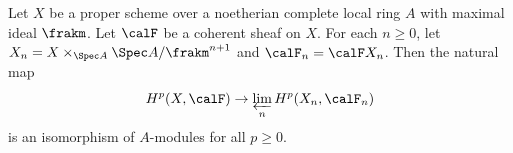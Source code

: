 \begin{theorem}\label{thm:theorem_on_the_formal_functions}
        Let \(X\) be a proper scheme over a noetherian complete local ring \(A\) with maximal ideal \(\frakm\).
        Let \(\calF\) be a coherent sheaf on \(X\).
        For each \(n \geq 0\), let \(X_n = X \times_{\Spec A} \Spec A/\frakm^{n+1}\) and \(\calF_n = \calF  X_n\).
        Then the natural map
        \[
            H^p(X, \calF) \to \varprojlim_n H^p(X_n, \calF_n)
        \]
        is an isomorphism of \(A\)-modules for all \(p \geq 0\).
    \end{theorem}

